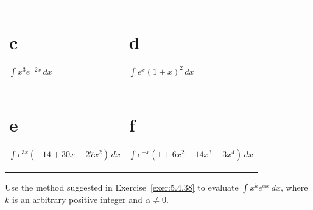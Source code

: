 \begin{exerciselist}
\begin{tabular}[t]{@{}p{168pt}@{}p{168pt}}
    \part{c} $\int x^{3}e^{-2x}\,dx$            & \part{d} $\int e^{x}(1+x)^{2}\,dx$                  \\[10pt]
    \part{e} $\int e^{3x}(-14+30x+27x^{2})\,dx$ & \part{f} $\int e^{-x}(1+6x^{2}-14x^{3}+3x^{4})\,dx$
  \end{tabular}

  \item\label{exer:5.4.40} Use the method suggested in Exercise~\ref{exer:5.4.38} to evaluate
        $\int x^{k}e^{\alpha x}\,dx$, where $k$ is an arbitrary positive integer and $\alpha\ne0$.
\end{exerciselist}
